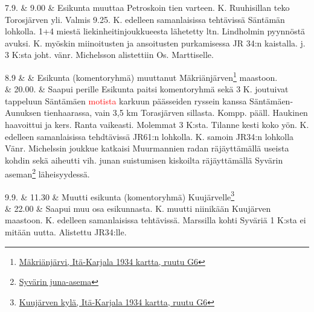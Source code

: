 \documentclass[11pt,a5paper,oneside]{book}
\begin{document}
\taulustop


7.9. & 9.00 & Esikunta muuttaa Petroskoin tien varteen.  K. Ruuhisillan teko Torosjärven yli. Valmis 9.25.  K. edelleen samanlaisissa tehtävissä Säntämän lohkolla. 1+4 miestä liekinheitinjoukkueesta lähetetty ltn. Lindholmin pyynnöstä avuksi.  K. myöskin miinoitusten ja ansoitusten purkamisessa JR 34:n kaistalla.\newline {} j. 3 K:sta joht. vänr. Michelsson alistettiin Os. Marttiselle. \\

\newpage

8.9 & & Esikunta (komentoryhmä) muuttanut Mäkriänjärven\footnote{\href{https://www.google.fi/maps/place/Ozero+Megrozero/@61.0482539,33.4942843,9161m/}{Mäkriänjärvi, Itä-Karjala 1934 kartta, ruutu G6}} maastoon.\\

& 20.00. & Saapui perille \newline Esikunta paitsi komentoryhmä sekä 3 K. joutuivat tappeluun Säntämäen \textcolor{red}{motista} karkuun päässeiden ryssein kanssa Säntämäen-Aunuksen tienhaarassa, vain 3,5 km Torasjärven sillasta. Kompp. pääll. Haukinen haavoittui ja kers. Ranta vaikeasti. Molemmat 3 K:sta. Tilanne kesti koko yön.  K. edelleen samanlaisissa tehdtävissä JR61:n lohkolla.  K. samoin JR34:n lohkolla Vänr. Michelssin joukkue katkaisi Muurmannien radan räjäyttämällä useista kohdin sekä aiheutti vih. junan suistumisen kiskoilta räjäyttämällä Syvärin aseman\footnote{\href{https://www.google.fi/maps/place/Svirj/@60.9491397,34.0823469,17z/}{Syvärin juna-asema}} läheisyydessä. \\

\taulustop


9.9. & 11.30 & Muutti esikunta (komentoryhmä) Kuujärvelle\footnote{\href{https://www.google.fi/maps/place/Klub+Sela+Mikhaylovskoye/@61.0159198,33.731745,17z/}{Kuujärven kylä, Itä-Karjala 1934 kartta, ruutu G6}} \\

& 22.00 & Saapui muu osa esikunnasta. K. muutti niinikään Kuujärven maastoon. K. edelleen samanlaisissa tehtävissä. Marssilla kohti Syväriä 1 K:sta ei mitään uutta. Alistettu JR34:lle. \\
\end{document}
